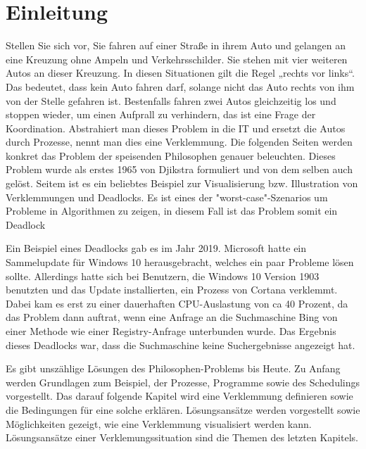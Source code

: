 \chapter{Einleitung}
\label{sec:Einleitung}
Stellen Sie sich vor, Sie fahren auf einer Straße in ihrem Auto und gelangen an eine Kreuzung ohne Ampeln und Verkehrsschilder. Sie stehen mit vier weiteren Autos an dieser Kreuzung. In diesen Situationen gilt die Regel „rechts vor links“. Das bedeutet, dass kein Auto fahren darf, solange nicht das Auto rechts von ihm von der Stelle gefahren ist. Bestenfalls fahren zwei Autos gleichzeitig los und stoppen wieder, um einen Aufprall zu verhindern, das ist eine Frage der Koordination.
Abstrahiert man dieses Problem in die IT und ersetzt die Autos durch Prozesse, nennt man dies eine Verklemmung.
Die folgenden Seiten werden konkret das Problem der speisenden Philosophen genauer beleuchten.
Dieses Problem wurde als erstes 1965 von Djikstra formuliert und von dem selben auch gelöst. Seitem ist es ein beliebtes Beispiel zur Visualisierung bzw. Illustration von Verklemmungen und Deadlocks. Es ist eines der "worst-case"-Szenarios um Probleme in Algorithmen zu zeigen, in diesem Fall ist das Problem somit ein Deadlock

Ein Beispiel eines Deadlocks gab es im Jahr 2019. Microsoft hatte ein Sammelupdate für Windows 10 herausgebracht, welches ein paar Probleme lösen sollte. Allerdings hatte sich bei Benutzern, die Windows 10 Version 1903 benutzten und das Update installierten, ein Prozess von Cortana verklemmt. Dabei kam es erst zu einer dauerhaften CPU-Auslastung von  ca 40 Prozent, da das Problem dann auftrat, wenn eine Anfrage an die Suchmaschine Bing von einer Methode wie einer Registry-Anfrage unterbunden wurde. Das Ergebnis dieses Deadlocks war, dass die Suchmaschine keine Suchergebnisse angezeigt hat. 

Es gibt unszählige Lösungen des Philosophen-Problems bis Heute. 
Zu Anfang werden Grundlagen zum Beispiel, der Prozesse, Programme sowie des Schedulings vorgestellt. Das darauf folgende Kapitel wird eine Verklemmung definieren sowie die Bedingungen für eine solche erklären. 
Lösungsansätze werden vorgestellt sowie Möglichkeiten gezeigt, wie eine Verklemmung visualisiert werden kann. Lösungsansätze einer Verklemungssituation sind die Themen des letzten Kapitels.
